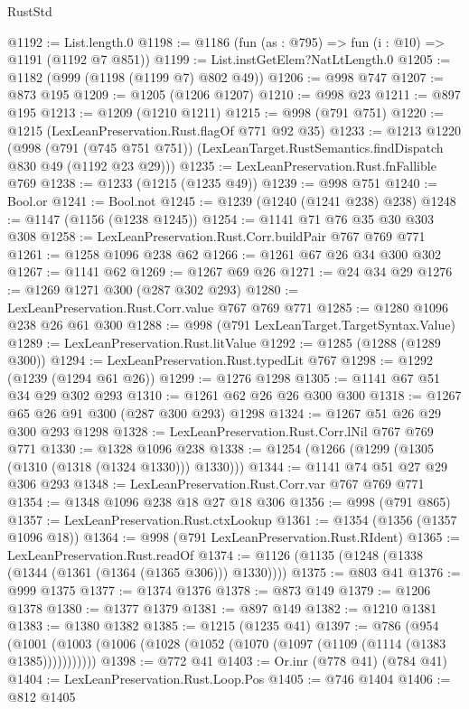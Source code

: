 \begin{lexlean}{RustStd}
\begin{coremodule}
@1192 := List.length.{0}
@1198 := @1186 (fun (as : @795) => fun (i : @10) => @1191 (@1192 @7 @851))
@1199 := List.instGetElem?NatLtLength.{0}
@1205 := @1182 (@999 (@1198 (@1199 @7) @802 @49))
@1206 := @998 @747
@1207 := @873 @195
@1209 := @1205 (@1206 @1207)
@1210 := @998 @23
@1211 := @897 @195
@1213 := @1209 (@1210 @1211)
@1215 := @998 (@791 @751)
@1220 := @1215 (LexLeanPreservation.Rust.flagOf @771 @92 @35)
@1233 := @1213
    @1220
    (@998
      (@791 (@745 @751 @751))
      (LexLeanTarget.RustSemantics.findDispatch @830 @49 (@1192 @23 @29)))
@1235 := LexLeanPreservation.Rust.fnFallible @769
@1238 := @1233 (@1215 (@1235 @49))
@1239 := @998 @751
@1240 := Bool.or
@1241 := Bool.not
@1245 := @1239 (@1240 (@1241 @238) @238)
@1248 := @1147 (@1156 (@1238 @1245))
@1254 := @1141 @71 @76 @35 @30 @303 @308
@1258 := LexLeanPreservation.Rust.Corr.buildPair @767 @769 @771
@1261 := @1258 @1096 @238 @62
@1266 := @1261 @67 @26 @34 @300 @302
@1267 := @1141 @62
@1269 := @1267 @69 @26
@1271 := @24 @34 @29
@1276 := @1269 @1271 @300 (@287 @302 @293)
@1280 := LexLeanPreservation.Rust.Corr.value @767 @769 @771
@1285 := @1280 @1096 @238 @26 @61 @300
@1288 := @998 (@791 LexLeanTarget.TargetSyntax.Value)
@1289 := LexLeanPreservation.Rust.litValue
@1292 := @1285 (@1288 (@1289 @300))
@1294 := LexLeanPreservation.Rust.typedLit @767
@1298 := @1292 (@1239 (@1294 @61 @26))
@1299 := @1276 @1298
@1305 := @1141 @67 @51 @34 @29 @302 @293
@1310 := @1261 @62 @26 @26 @300 @300
@1318 := @1267 @65 @26 @91 @300 (@287 @300 @293) @1298
@1324 := @1267 @51 @26 @29 @300 @293 @1298
@1328 := LexLeanPreservation.Rust.Corr.lNil @767 @769 @771
@1330 := @1328 @1096 @238
@1338 := @1254 (@1266 (@1299 (@1305 (@1310 (@1318 (@1324 @1330))) @1330)))
@1344 := @1141 @74 @51 @27 @29 @306 @293
@1348 := LexLeanPreservation.Rust.Corr.var @767 @769 @771
@1354 := @1348 @1096 @238 @18 @27 @18 @306
@1356 := @998 (@791 @865)
@1357 := LexLeanPreservation.Rust.ctxLookup
@1361 := @1354 (@1356 (@1357 @1096 @18))
@1364 := @998 (@791 LexLeanPreservation.Rust.RIdent)
@1365 := LexLeanPreservation.Rust.readOf
@1374 := @1126 (@1135 (@1248 (@1338 (@1344 (@1361 (@1364 (@1365 @306))) @1330))))
@1375 := @803 @41
@1376 := @999 @1375
@1377 := @1374 @1376
@1378 := @873 @149
@1379 := @1206 @1378
@1380 := @1377 @1379
@1381 := @897 @149
@1382 := @1210 @1381
@1383 := @1380 @1382
@1385 := @1215 (@1235 @41)
@1397 := @786
    (@954 (@1001 (@1003 (@1006 (@1028 (@1052 (@1070 (@1097 (@1109 (@1114 (@1383 @1385)))))))))))
@1398 := @772 @41
@1403 := Or.inr (@778 @41) (@784 @41)
@1404 := LexLeanPreservation.Rust.Loop.Pos
@1405 := @746 @1404
@1406 := @812 @1405

\end{coremodule}
\end{lexlean}
